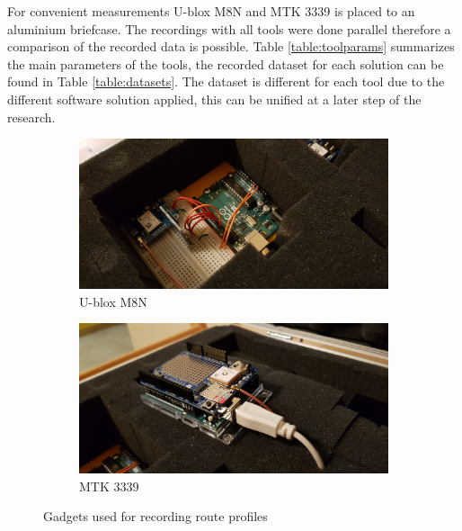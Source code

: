 \documentclass{article}
\begin{document}
			For convenient measurements U-blox M8N and MTK 3339 is placed to an aluminium briefcase. The recordings with all tools were done parallel therefore a comparison of the recorded data is possible. Table \ref{table:toolparams} summarizes the main parameters of the tools, the recorded dataset for each solution can be found in Table \ref{table:datasets}. The dataset is different for each tool due to the different software solution applied, this can be unified at a later step of the research. \\
			\begin{figure}[h]
		   		\centering
		     	\begin{subfigure}[b]{0.45\textwidth}
		      		\centering
		      	  	\includegraphics[width=\textwidth]{gadget_1.jpg}
		      	   \caption{U-blox M8N}
		      	   \label{fig:gadget1}
		     	\end{subfigure}
		     	\begin{subfigure}[b]{0.45\textwidth}
		      	   \centering
		      	   \includegraphics[width=\textwidth]{gadget_2.jpg}
		      	   \caption{MTK 3339}
		      	   \label{fig:gadget2}
		     	\end{subfigure}
		      \caption{Gadgets used for recording route profiles}
		      \label{fig:gadgets}
			\end{figure}		
\end{document}
